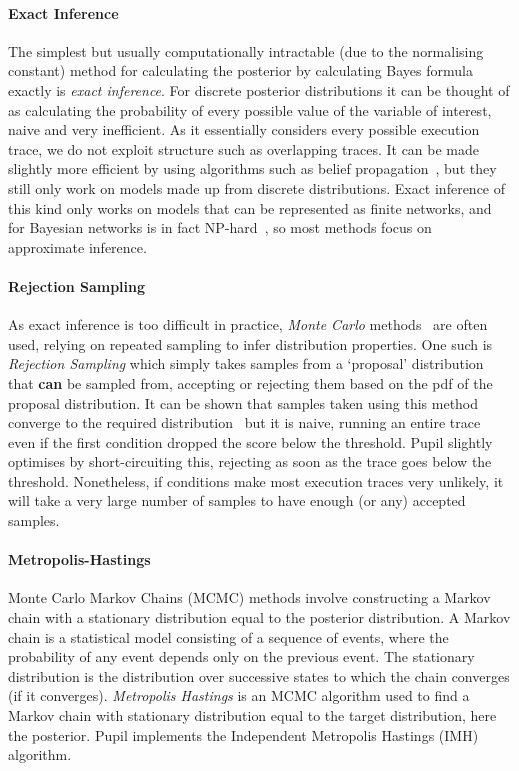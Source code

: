 \documentclass[sigconf,timestamp]{acmart}
\newcommand{\pupil}{Pupil\xspace}
\begin{document}
\paragraph{Exact Inference}
The simplest but usually computationally intractable (due to the normalising constant) method for calculating the posterior by calculating Bayes formula exactly is \emph{exact inference}. For discrete posterior distributions it can be thought of as calculating the probability of every possible value of the variable of interest, naive and very inefficient. As it essentially considers every possible execution trace, we do not exploit structure such as overlapping traces. It can be made slightly more efficient by using algorithms such as belief propagation~\cite{belief-prop}, but they still only work on models made up from discrete distributions. Exact inference of this kind only works on models that can be represented as finite networks, and for Bayesian networks is in fact NP-hard~\cite{cooper1990computational}, so most methods focus on approximate inference.

\paragraph{Rejection Sampling}
As exact inference is too difficult in practice, \emph{Monte Carlo} methods~\cite{monte-carlo} are often used, relying on repeated sampling to infer distribution properties. One such is \emph{Rejection Sampling} which simply takes samples from a `proposal' distribution that {\bf can} be sampled from, accepting or rejecting them based on the pdf of the proposal distribution. It can be shown that samples taken using this method converge to the required distribution~\cite{flury1990acceptance} but it is naive, running an entire trace even if the first condition dropped the score below the threshold. \pupil slightly optimises by short-circuiting this, rejecting as soon as the trace goes below the threshold. Nonetheless, if conditions make most execution traces very unlikely, it will take a very large number of samples to have enough (or any) accepted samples.

\paragraph{Metropolis-Hastings}
Monte Carlo Markov Chains (MCMC) methods involve constructing a Markov chain with a stationary distribution equal to the posterior distribution. A Markov chain is a statistical model consisting of a sequence of events, where the probability of any event depends only on the previous event. The stationary distribution is the distribution over successive states to which the chain converges (if it converges). \emph{Metropolis Hastings} is an MCMC algorithm used to find a Markov chain with stationary distribution equal to the target distribution, here the posterior. \pupil implements the Independent Metropolis Hastings (IMH) algorithm.
\end{document}
